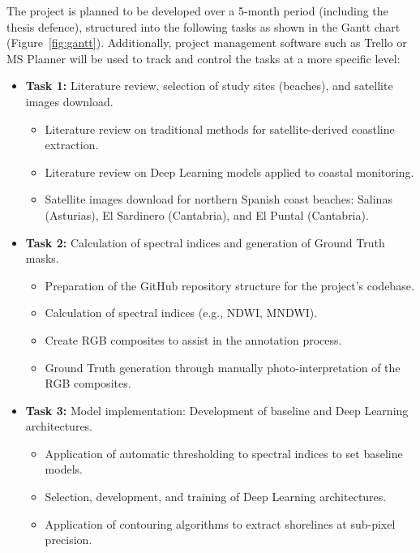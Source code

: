 ﻿\documentclass[ENG]{TFUOC}%
\begin{document}
The project is planned to be developed over a 5-month period (including the thesis defence), structured into the following tasks as shown in the Gantt chart (Figure~\ref{fig:gantt}). Additionally, project management software such as Trello or MS Planner will be used to track and control the tasks at a more specific level:
\begin{itemize}
    \item \textbf{Task 1:} Literature review, selection of study sites (beaches), and satellite images download.
    \begin{itemize}
        \item Literature review on traditional methods for satellite-derived coastline extraction.
        \item Literature review on Deep Learning models applied to coastal monitoring.
        \item Satellite images download for northern Spanish coast beaches: Salinas (Asturias), El Sardinero (Cantabria), and El Puntal (Cantabria).
    \end{itemize}
    \item \textbf{Task 2:} Calculation of spectral indices and generation of Ground Truth masks.
    \begin{itemize}
        \item Preparation of the GitHub repository structure for the project's codebase.
        \item Calculation of spectral indices (e.g., NDWI, MNDWI).
        \item Create RGB composites to assist in the annotation process.
        \item Ground Truth generation through manually photo-interpretation of the RGB composites.
    \end{itemize}
    \item \textbf{Task 3:} Model implementation: Development of baseline and Deep Learning architectures.
    \begin{itemize}
        \item Application of automatic thresholding to spectral indices to set baseline models.
        \item Selection, development, and training of Deep Learning architectures.
        \item Application of contouring algorithms to extract shorelines at sub-pixel precision.

\end{itemize}
\end{itemize}
\end{document}
